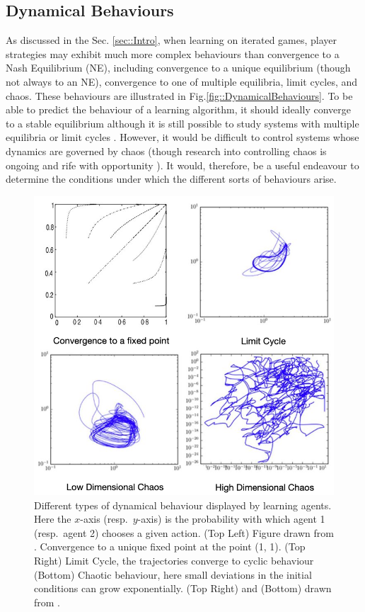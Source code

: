 \documentclass[sigconf,anonymous]{aamas}
\begin{document}
\subsection{Dynamical Behaviours}
\label{sec::DynamicalBehaviours}

    As discussed in the Sec. \ref{sec::Intro}, when learning on iterated
    games, player strategies may exhibit much more complex behaviours
    than convergence to a Nash Equilibrium (NE), including convergence
    to a unique equilibrium (though not always to an NE), convergence
    to one of multiple equilibria, limit cycles, and chaos. These
    behaviours are illustrated in
    Fig.\ref{fig::DynamicalBehaviours}. To be able to predict the
    behaviour of a learning algorithm, it should ideally converge to a
    stable equilibrium although it is still possible to study systems
    with multiple equilibria or limit cycles
    \cite{Strogatz2000}. However, it would be difficult to control
    systems whose dynamics are governed by chaos (though research into
    controlling chaos is ongoing and rife with opportunity
    \cite{Fradkov2009}). It would, therefore, be a useful endeavour to
    determine the conditions under which the different sorts of behaviours
    arise.
%
    \begin{figure}[t]
    \centering
    \includegraphics[width = \linewidth]{Figures/DynamicalBehaviours.png}
    \caption{Different types of dynamical behaviour
       displayed
        by learning agents. Here the $x$-axis (resp.~$y$-axis) is the probability with which agent 1 (resp.~agent 2) chooses a given action. (Top Left) Figure drawn from \cite{Tuyls2006AnGames}.
        Convergence
        to a unique fixed point at the point (1, 1). (Top Right) Limit Cycle, the trajectories converge to cyclic behaviour (Bottom)
        Chaotic behaviour, here small deviations in the initial conditions can grow
        exponentially. (Top Right) and (Bottom) drawn from \cite{Sanders2018}.}
\end{figure}
\end{document}

